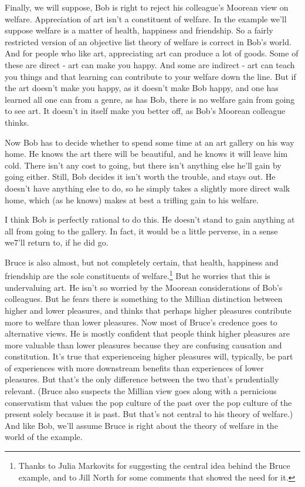 \documentclass[
  10pt,
  letterpaper,
  DIV=11,
  numbers=noendperiod,
  twoside]{scrartcl}
\begin{document}
Finally, we will suppose, Bob is right to reject his colleague's Moorean
view on welfare. Appreciation of art isn't a constituent of welfare. In
the example we'll suppose welfare is a matter of health, happiness and
friendship. So a fairly restricted version of an objective list theory
of welfare is correct in Bob's world. And for people who like art,
appreciating art can produce a lot of goods. Some of these are direct -
art can make you happy. And some are indirect - art can teach you things
and that learning can contribute to your welfare down the line. But if
the art doesn't make you happy, as it doesn't make Bob happy, and one
has learned all one can from a genre, as has Bob, there is no welfare
gain from going to see art. It doesn't in itself make you better off, as
Bob's Moorean colleague thinks.

Now Bob has to decide whether to spend some time at an art gallery on
his way home. He knows the art there will be beautiful, and he knows it
will leave him cold. There isn't any cost to going, but there isn't
anything else he'll gain by going either. Still, Bob decides it isn't
worth the trouble, and stays out. He doesn't have anything else to do,
so he simply takes a slightly more direct walk home, which (as he knows)
makes at best a trifling gain to his welfare.

I think Bob is perfectly rational to do this. He doesn't stand to gain
anything at all from going to the gallery. In fact, it would be a little
perverse, in a sense we7'll return to, if he did go.

Bruce is also almost, but not completely certain, that health, happiness
and friendship are the sole constituents of welfare.\footnote{Thanks to
  Julia Markovits for suggesting the central idea behind the Bruce
  example, and to Jill North for some comments that showed the need for
  it.} But he worries that this is undervaluing art. He isn't so worried
by the Moorean considerations of Bob's colleagues. But he fears there is
something to the Millian distinction between higher and lower pleasures,
and thinks that perhaps higher pleasures contribute more to welfare than
lower pleasures. Now most of Bruce's credence goes to alternative views.
He is mostly confident that people think higher pleasures are more
valuable than lower pleasures because they are confusing causation and
constitution. It's true that experienceing higher pleasures will,
typically, be part of experiences with more downstream benefits than
experiences of lower pleasures. But that's the only difference between
the two that's prudentially relevant. (Bruce also suspects the Millian
view goes along with a pernicious conservatism that values the pop
culture of the past over the pop culture of the present solely because
it is past. But that's not central to his theory of welfare.) And like
Bob, we'll assume Bruce is right about the theory of welfare in the
world of the example.
\end{document}

